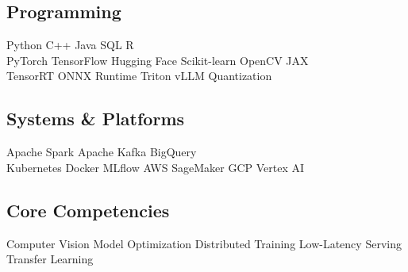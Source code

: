 \documentclass[../main.tex]{subfiles}
\begin{document}
\subsection{Programming}
Python \textbullet{} C++ \textbullet{} Java \textbullet{} SQL \textbullet{} R \\
PyTorch \textbullet{} TensorFlow \textbullet{} Hugging Face \textbullet{} Scikit-learn \textbullet{} OpenCV \textbullet{} JAX \\
TensorRT \textbullet{} ONNX Runtime \textbullet{} Triton \textbullet{} vLLM \textbullet{} Quantization \\

\subsection{Systems \& Platforms}
Apache Spark \textbullet{} Apache Kafka \textbullet{} BigQuery \\
Kubernetes \textbullet{} Docker \textbullet{} MLflow \textbullet{} AWS SageMaker \textbullet{} GCP Vertex AI \\

\subsection{Core Competencies}
Computer Vision \textbullet{} Model Optimization \textbullet{} Distributed Training \textbullet{} Low-Latency Serving \textbullet{} Transfer Learning
\end{document}
